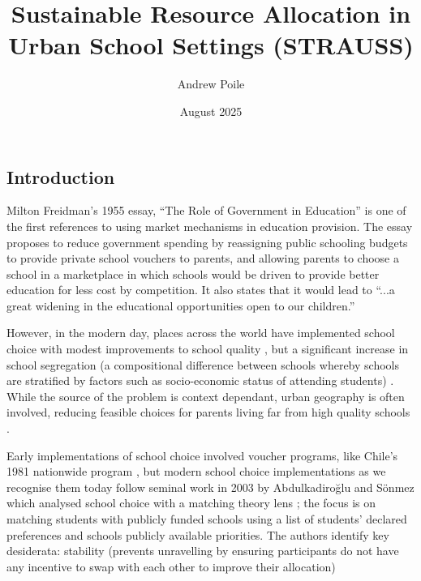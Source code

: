 \documentclass{article}
\title{Sustainable Resource Allocation in Urban School Settings (STRAUSS)}
\author{Andrew Poile}
\date{August 2025}
\begin{document}
\maketitle

\begin{multicols}{2}
\section{Introduction}
Milton Freidman's 1955 essay, \enquote{The Role of Government in Education} \cite{friedmanRoleGovernmentEducation1955} is one of the first references to using market mechanisms in education provision. The essay proposes to reduce government spending by reassigning public schooling budgets to provide private school vouchers to parents, and allowing parents to choose a school in a marketplace in which schools would be driven to provide better education for less cost by competition. It also states that it would lead to \enquote{...a great widening in the educational opportunities open to our children.}

However, in the modern day, places across the world have implemented school choice with modest improvements to school quality \cite{gibbonsChoiceCompetitionPupil2008,hsiehEffectsGeneralizedSchool2006,gleasonEvaluationCharterSchool,eppleSchoolVouchersSurvey2017,quintero-fragozoEffectsSpatialCompetition2023}, but a significant increase in school segregation (a compositional difference between schools whereby schools are stratified by factors such as socio-economic status of attending students) \cite{wilsonSchoolChoiceCity2019}. While the source of the problem is context dependant, urban geography is often involved, reducing feasible choices for parents living far from high quality schools \cite{burgessParentalChoicePrimary2011a,burgessSchoolChoiceEngland2019}.

Early implementations of school choice involved voucher programs, like Chile's 1981 nationwide program \cite{hsiehEffectsGeneralizedSchool2006}, but modern school choice implementations as we recognise them today follow seminal work in 2003 by Abdulkadiroğlu and Sönmez which analysed school choice with a matching theory lens \cite{abdulkadirogluSchoolChoiceMechanism2003}; the focus is on matching students with publicly funded schools using a list of students' declared preferences and schools publicly available priorities. The authors identify key desiderata: stability (prevents unravelling by ensuring participants do not have any incentive to swap with each other to improve their allocation)


\end{multicols}
\end{document}
